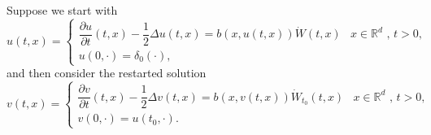 \documentclass{article}
\numberwithin{equation}{section}
\newcommand{\R}{\mathbb{R}}
\begin{document}
Suppose we start with
	\begin{equation} \label{E:SHE1}
		u(t,x) =
		\begin{cases}
		\dfrac{\partial u}{\partial t}(t,x)-\dfrac{1}{2}\Delta u(t,x) = b(x,u(t,x))\dot W(t,x) & \text{$x\in \R^d$ , $t>0$}, \\
		u(0,\cdot) = \delta_0(\cdot),                                                               &
		\end{cases}
	\end{equation}
and then consider the restarted solution
	\begin{equation} \label{E:SHErestar1}
		v(t,x) =
		\begin{cases}
		\dfrac{\partial v}{\partial t}(t,x)-\dfrac{1}{2}\Delta v(t,x) = b(x,v(t,x))\dot W_{t_0}(t,x) & \text{$x\in \R^d$ , $t>0$}, \\
		v(0,\cdot) = u(t_0,\cdot)       .                                                     &
		\end{cases}
	\end{equation}
\end{document}
